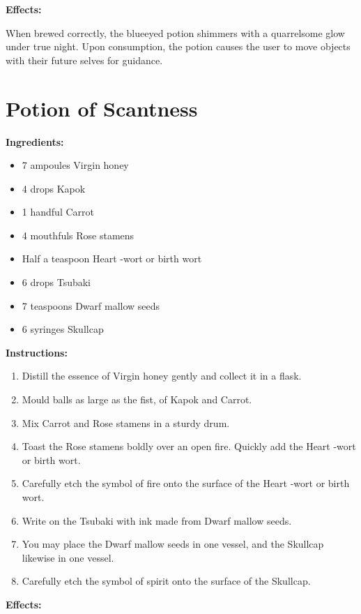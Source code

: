 \documentclass{article}
\begin{document}
\textbf{Effects:}

When brewed correctly, the blueeyed potion shimmers with a quarrelsome glow under true night. Upon consumption, the potion causes the user to move objects with their future selves for guidance.

\newpage
\section*{Potion of Scantness}

\textbf{Ingredients:}

\begin{itemize}
  \item 7 ampoules Virgin honey
  \item 4 drops Kapok
  \item 1 handful Carrot
  \item 4 mouthfuls Rose stamens
  \item Half a teaspoon Heart -wort or birth wort
  \item 6 drops Tsubaki
  \item 7 teaspoons Dwarf mallow seeds
  \item 6 syringes Skullcap
\end{itemize}

\textbf{Instructions:}

\begin{enumerate}
  \item Distill the essence of Virgin honey gently and collect it in a flask.
  \item Mould balls as large as the fist, of Kapok and Carrot.
  \item Mix Carrot and Rose stamens in a sturdy drum.
  \item Toast the Rose stamens boldly over an open fire. Quickly add the Heart -wort or birth wort.
  \item Carefully etch the symbol of fire onto the surface of the Heart -wort or birth wort.
  \item Write on the Tsubaki with ink made from Dwarf mallow seeds.
  \item You may place the Dwarf mallow seeds in one vessel, and the Skullcap likewise in one vessel.
  \item Carefully etch the symbol of spirit onto the surface of the Skullcap.
\end{enumerate}

\textbf{Effects:}
\end{document}
